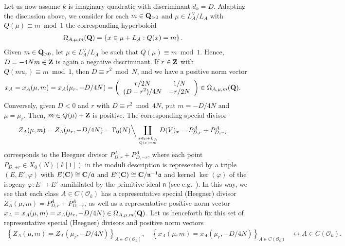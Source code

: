 \documentclass{amsart}
\theoremstyle{definition}
\theoremstyle{definition}
\theoremstyle{definition}
\begin{document}
Let us now assume $k$ is imaginary quadratic with discriminant $d_k= D$.
Adapting the discussion above, we consider for each $m \in {\bf{Q}}_{>0}$ and $\mu \in L_A^{\vee}/L_A$ 
with $Q(\mu) \equiv m \bmod 1$ the corresponding hyperboloid 
\begin{align*} \Omega_{A, \mu, m}({\bf{Q}}) &= \left\lbrace x \in \mu + L_A : Q(x) = m \right\rbrace. \end{align*}
Given $m \in {\bf{Q}}_{>0}$, let $\mu \in L_A^{\vee}/L_A$ be such that $Q(\mu) \equiv m \bmod 1$.
Hence, $D = -4N m \in {\bf{Z}}$ is again a negative discriminant. If $r \in {\bf{Z}}$ with $Q(mu_r) \equiv m \bmod 1$, then $D \equiv r^2 \bmod N$, and we have a positive norm vector 
\begin{align*} x_A = x_A(\mu, m) = x_A(\mu_r, -D/4N)
&= \left( \begin{array}{cc} r/2N & 1/N \\ (D-r^2)/4N & - r/2N \end{array} \right) \in \Omega_{A, \mu, m}({\bf{Q}}). \end{align*}
Conversely, given $D<0$ and $r$ with $D \equiv r^2 \bmod 4N$, put $m = -D/4N$ and $\mu = \mu_r$. 
Then, $m \in Q(\mu) + {\bf{Z}}$ is positive. The corresponding special divisor
\begin{align*} Z_A(\mu, m) = Z_A(\mu_r, -D/4N) 
&= \Gamma_0(N) \Big\backslash \coprod\limits_{  x \in \mu + L_A \atop Q(x) = m  } D(V)_x  = P_{D,r}^A + P_{D, -r}^A \end{align*}
corresponds to the Heegner divisor $P_{D, r}^A + P_{D, -r}^A$, where each point $P_{D, \pm r} \in X_0(N)(k[1])$ in the moduli 
description is represented by a triple $(E, E', \varphi)$ with $E({\bf{C}}) \cong {\bf{C}}/ \mathfrak{a}$ and $E' ({\bf{C}}) \cong {\bf{C}}/ \mathfrak{n}^{-1} \mathfrak{a}$ 
and kernel $\ker(\varphi)$ of the isogeny $\varphi: E \rightarrow E'$ annihilated by the primitive ideal $\mathfrak{n}$ (see e.g.~\cite[$\S$II.1]{GZ}).
In this way, we see that each class $A \in C(\mathcal{O}_{k})$ 
has a representative special (Heegner) divisor $Z_A(\mu, m) = P_{D, r}^A + P_{D, -r}^A$, 
as well as a representative positive norm vector
$x_A = x_A(\mu, m) = x_A(\mu_r, -D/4N) \in \Omega_{A, \mu, m}({\bf{Q}})$.
Let us henceforth fix this set of representative special (Heegner) divisors and positive norm vectors
\begin{align}\label{representatives} \left\lbrace Z_A(\mu, m) = Z_A(\mu_r, -D/4N) \right\rbrace_{A \in C(\mathcal{O}_k)}, \quad
\left\lbrace  x_A(\mu, m) = x_A(\mu_r, -D/4N) \right\rbrace_{A \in C(\mathcal{O}_k)}
&\longleftrightarrow A \in C( \mathcal{O}_k). \end{align}
\end{document}
